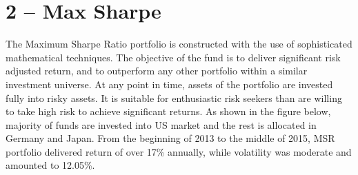 \documentclass[11pt, parskip=full, DIV=14, headings=small, footsepline, footinclude=false, headsepline]{scrreprt}
\begin{document}
\newpage\section{2 -- Max Sharpe}
The Maximum Sharpe Ratio portfolio is constructed with the use of sophisticated mathematical techniques. The objective of the fund is to deliver significant risk adjusted return, and to outperform any other portfolio within a similar investment universe. 
At any point in time, assets of the portfolio are invested fully into risky assets. It is suitable for enthusiastic risk seekers than are willing to take high risk to achieve significant returns. As shown in the figure below, majority of funds are invested into US market and the rest is allocated in Germany and Japan. From the beginning of 2013 to the middle of 2015, MSR portfolio delivered return of over 17\% annually, while volatility was moderate and amounted to 12.05\%. 

\begin{figure}[H]
\end{figure}
\end{document}
